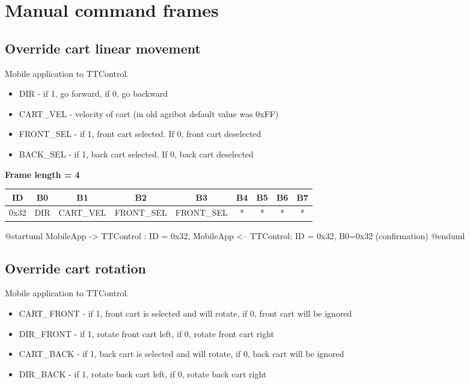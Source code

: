 \documentclass{article}
\begin{document}
\newpage
\section{Manual command frames}

\subsection{Override cart linear movement}

Mobile application to TTControl.

\begin{itemize}
    \item DIR - if 1, go forward, if 0, go backward
    \item CART\_VEL - velocity of cart (in old agribot default value was 0xFF)
    \item FRONT\_SEL - if 1, front cart selected. If 0, front cart deselected
    \item BACK\_SEL - if 1, back cart selected. If 0, back cart deselected
\end{itemize}{}

\textbf{Frame length = 4}
\begin{center}
    \begin{tabular}{|c| c | c | c | c | c | c | c | c |}
        \hline
        ID   & B0  & B1        & B2         & B3         & B4 & B5 & B6 & B7 \\
        \hline
        0x32 & DIR & CART\_VEL & FRONT\_SEL & FRONT\_SEL & *  & *  & *  & *  \\
        \hline
    \end{tabular}
\end{center}

\begin{plantuml}
    @startuml
    MobileApp -> TTControl : ID = 0x32, 
    MobileApp <-- TTControl: ID = 0x32, B0=0x32 (confirmation)
    @enduml
\end{plantuml}

\subsection{Override cart rotation}

Mobile application to TTControl.

\begin{itemize}
    \item CART\_FRONT - if 1, front cart is selected and will rotate, if 0, front cart will be ignored
    \item DIR\_FRONT - if 1, rotate front cart left, if 0, rotate front cart right
    \item CART\_BACK - if 1, back cart is selected and will rotate, if 0, back cart will be ignored
    \item DIR\_BACK - if 1, rotate back cart left, if 0, rotate back cart right
\end{itemize}{}
\end{document}
